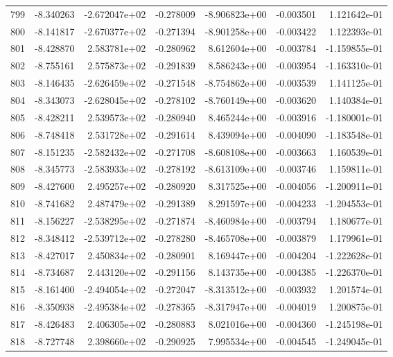 \begin{tabular}{rrrrrrr}
 799 &  -8.340263 & -2.672047e+02 & -0.278009 & -8.906823e+00 &   -0.003501 &  1.121642e-01 \\
 800 &  -8.141817 & -2.670377e+02 & -0.271394 & -8.901258e+00 &   -0.003422 &  1.122393e-01 \\
 801 &  -8.428870 &  2.583781e+02 & -0.280962 &  8.612604e+00 &   -0.003784 & -1.159855e-01 \\
 802 &  -8.755161 &  2.575873e+02 & -0.291839 &  8.586243e+00 &   -0.003954 & -1.163310e-01 \\
 803 &  -8.146435 & -2.626459e+02 & -0.271548 & -8.754862e+00 &   -0.003539 &  1.141125e-01 \\
 804 &  -8.343073 & -2.628045e+02 & -0.278102 & -8.760149e+00 &   -0.003620 &  1.140384e-01 \\
 805 &  -8.428211 &  2.539573e+02 & -0.280940 &  8.465244e+00 &   -0.003916 & -1.180001e-01 \\
 806 &  -8.748418 &  2.531728e+02 & -0.291614 &  8.439094e+00 &   -0.004090 & -1.183548e-01 \\
 807 &  -8.151235 & -2.582432e+02 & -0.271708 & -8.608108e+00 &   -0.003663 &  1.160539e-01 \\
 808 &  -8.345773 & -2.583933e+02 & -0.278192 & -8.613109e+00 &   -0.003746 &  1.159811e-01 \\
 809 &  -8.427600 &  2.495257e+02 & -0.280920 &  8.317525e+00 &   -0.004056 & -1.200911e-01 \\
 810 &  -8.741682 &  2.487479e+02 & -0.291389 &  8.291597e+00 &   -0.004233 & -1.204553e-01 \\
 811 &  -8.156227 & -2.538295e+02 & -0.271874 & -8.460984e+00 &   -0.003794 &  1.180677e-01 \\
 812 &  -8.348412 & -2.539712e+02 & -0.278280 & -8.465708e+00 &   -0.003879 &  1.179961e-01 \\
 813 &  -8.427017 &  2.450834e+02 & -0.280901 &  8.169447e+00 &   -0.004204 & -1.222628e-01 \\
 814 &  -8.734687 &  2.443120e+02 & -0.291156 &  8.143735e+00 &   -0.004385 & -1.226370e-01 \\
 815 &  -8.161400 & -2.494054e+02 & -0.272047 & -8.313512e+00 &   -0.003932 &  1.201574e-01 \\
 816 &  -8.350938 & -2.495384e+02 & -0.278365 & -8.317947e+00 &   -0.004019 &  1.200875e-01 \\
 817 &  -8.426483 &  2.406305e+02 & -0.280883 &  8.021016e+00 &   -0.004360 & -1.245198e-01 \\
 818 &  -8.727748 &  2.398660e+02 & -0.290925 &  7.995534e+00 &   -0.004545 & -1.249045e-01 \\

\end{tabular}
